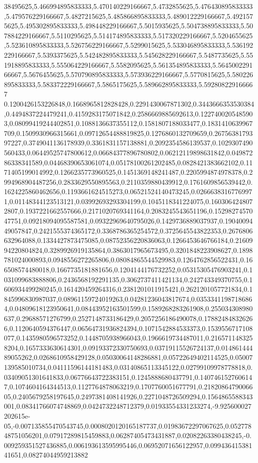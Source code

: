 38495625,5.466994895833333,5.470140229166667,5.4732855625,5.476430895833333,5.479576229166667,5.4827215625,5.485866895833333,5.489012229166667,5.4921575625,5.495302895833333,5.498448229166667,5.5015935625,5.504738895833333,5.507884229166667,5.5110295625,5.514174895833333,5.517320229166667,5.5204655625,5.523610895833333,5.526756229166667,5.5299015625,5.533046895833333,5.536192229166667,5.5393375625,5.542482895833333,5.545628229166667,5.5487735625,5.551918895833333,5.555064229166667,5.5582095625,5.561354895833333,5.564500229166667,5.5676455625,5.570790895833333,5.573936229166667,5.5770815625,5.580226895833333,5.583372229166667,5.5865175625,5.589662895833333,5.592808229166667
0.1200426153226848,0.1668965812828428,0.2291430067871302,0.3443666353530384,0.4494837224479241,0.4159283175071842,0.2586669885692613,0.1227400205485903,0.08099419244402851,0.1088136637355112,0.1581807188033477,0.1831410639967709,0.1509930966315661,0.09712654488819825,0.1276860132709659,0.2675638179397227,0.3749041136178939,0.3361831157138881,0.2092354586139537,0.1029307490560433,0.06449525747800612,0.06684377896780802,0.06212119898631842,0.04987286338341589,0.04468390653061074,0.05178100261202485,0.0828421383662102,0.1171405199014992,0.1266235773960525,0.1451369148241487,0.2205994874978378,0.2994968904487256,0.2833629550895563,0.2110359880439912,0.1761609856539442,0.1624225860462656,0.1193661624515273,0.06521524140473245,0.02666383167769971,0.01148344123513121,0.03992693293304199,0.1045118341224075,0.1603064248072807,0.1937221662557666,0.2171020769341164,0.2083245543651196,0.1529827457047751,0.09218094095587581,0.09322969640795026,0.1429736889037937,0.1904009449057847,0.2421555374365172,0.3368786365254572,0.3725645543822353,0.2676806632964088,0.1334427873475085,0.08752356220836063,0.1266453646766184,0.2160994220804824,0.3289926919135864,0.3863017965673495,0.3201848223908627,0.1898781024000893,0.0948556272265806,0.08084865544529983,0.1264762856522431,0.166508574480018,0.1667735181881656,0.1204144176732252,0.05315305476903241,0.1031099683888806,0.2436568192291135,0.3062737411421134,0.242743349370755,0.1606934499280245,0.161420459264316,0.2381201011915421,0.2621201057721834,0.1845996830987037,0.08961159724019263,0.04281236043817674,0.03533411987186864,0.04809618123950641,0.08443952163501599,0.1589268283261908,0.255034308980637,0.29688571276799,0.2527148733186429,0.2057256186490078,0.178824848326266,0.1120640594376447,0.06564731936824394,0.1071542884533373,0.1539556717108077,0.1435980596573252,0.1448705938966043,0.1966619734487011,0.2165711483258204,0.1657333630614301,0.09193372330750693,0.03719115526724137,0.01486144489055262,0.0268610958429128,0.05030064148286881,0.05722649402114525,0.05007139585010734,0.04111596144181483,0.03140865113345122,0.02799109978778818,0.03409051301641833,0.06776643722383151,0.1245888680437791,0.1407461527606147,0.1074604164344513,0.1127764878063219,0.1707760051677791,0.2182086479006605,0.2405679258197645,0.2497381408141926,0.2271048726509294,0.1564865588343001,0.08341766074748869,0.0424732248712379,0.01933554331233274,-9.925600027202615e-05,-0.007135855470543745,0.0008020120165187737,0.01983672297067625,0.05277848751056201,0.07917289815459883,0.06287405473431887,0.02082263380438245,-0.009259351527436885,0.006193613595995446,0.06952071656122957,0.09943641538141651,0.08274044959213882